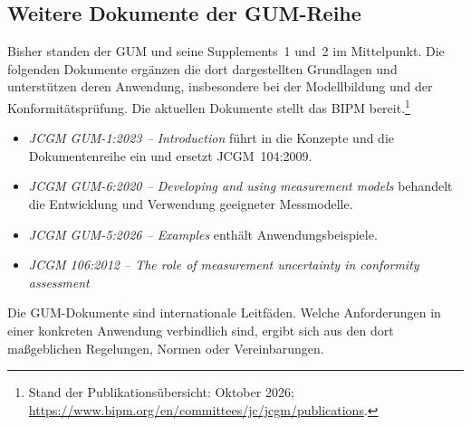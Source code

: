 \subsection{Weitere Dokumente der GUM-Reihe}

Bisher standen der GUM und seine Supplements~1 und~2 im Mittelpunkt.
Die folgenden Dokumente ergänzen die dort dargestellten Grundlagen
und unterstützen deren Anwendung, insbesondere bei der Modellbildung
und der Konformitätsprüfung. Die aktuellen Dokumente stellt das BIPM bereit.\footnote{Stand der
Publikationsübersicht: Oktober 2026;
\url{https://www.bipm.org/en/committees/jc/jcgm/publications}.}
\begin{itemize}
\item \textsl{JCGM GUM-1:2023 -- Introduction} führt in die Konzepte und die
Dokumentenreihe ein und ersetzt JCGM~104:2009.
\item \textsl{JCGM GUM-6:2020 -- Developing and using measurement models}
behandelt die Entwicklung und Verwendung geeigneter Messmodelle.
\item \textsl{JCGM GUM-5:2026 -- Examples} enthält Anwendungsbeispiele.
\item \textsl{JCGM 106:2012 -- The role of measurement uncertainty in
conformity assessment}
\end{itemize}
Die GUM-Dokumente sind internationale Leitfäden. Welche Anforderungen in
einer konkreten Anwendung verbindlich sind, ergibt sich aus den dort
maßgeblichen Regelungen, Normen oder Vereinbarungen.


